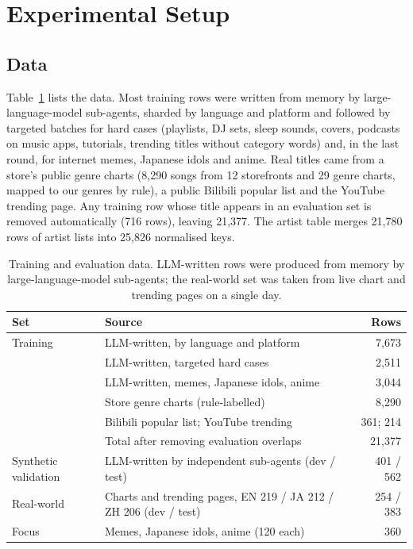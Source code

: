 \documentclass[11pt]{article}
\begin{document}
\section{Experimental Setup}
\label{sec:setup}

\subsection{Data}
\label{sec:data}

Table~\ref{tab:data} lists the data. Most training rows were written from memory by large-language-model sub-agents, sharded by language and platform and followed by targeted batches for hard cases (playlists, DJ sets, sleep sounds, covers, podcasts on music apps, tutorials, trending titles without category words) and, in the last round, for internet memes, Japanese idols and anime. Real titles came from a store's public genre charts (8,290 songs from 12 storefronts and 29 genre charts, mapped to our genres by rule), a public Bilibili popular list and the YouTube trending page. Any training row whose title appears in an evaluation set is removed automatically (716 rows), leaving 21,377. The artist table merges 21,780 rows of artist lists into 25,826 normalised keys.

\begin{table}[t]
  \centering
  \small
  \caption{Training and evaluation data. LLM-written rows were produced from memory by large-language-model sub-agents; the real-world set was taken from live chart and trending pages on a single day.}
  \label{tab:data}
  \begin{tabular}{@{}llr@{}}
    \toprule
    Set & Source & Rows \\
    \midrule
    Training & LLM-written, by language and platform & 7,673 \\
             & LLM-written, targeted hard cases & 2,511 \\
             & LLM-written, memes, Japanese idols, anime & 3,044 \\
             & Store genre charts (rule-labelled) & 8,290 \\
             & Bilibili popular list; YouTube trending & 361; 214 \\
             & Total after removing evaluation overlaps & 21,377 \\
    \midrule
    Synthetic validation & LLM-written by independent sub-agents (dev / test) & 401 / 562 \\
    Real-world & Charts and trending pages, EN 219 / JA 212 / ZH 206 (dev / test) & 254 / 383 \\
    Focus & Memes, Japanese idols, anime (120 each) & 360 \\
    \bottomrule
  \end{tabular}
\end{table}
\end{document}
